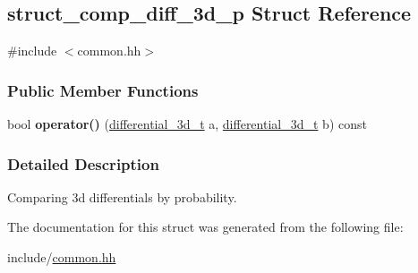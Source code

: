 \hypertarget{structstruct__comp__diff__3d__p}{\subsection{struct\-\_\-comp\-\_\-diff\-\_\-3d\-\_\-p \-Struct \-Reference}
\label{structstruct__comp__diff__3d__p}
}


{\ttfamily \#include $<$common.\-hh$>$}

\subsubsection*{\-Public \-Member \-Functions}
\begin{DoxyCompactItemize}
\item 
\hypertarget{structstruct__comp__diff__3d__p_a364005f05d94cd9f4477692cc3404bf1}{bool {\bfseries operator()} (\hyperlink{structdifferential__3d__t}{differential\-\_\-3d\-\_\-t} a, \hyperlink{structdifferential__3d__t}{differential\-\_\-3d\-\_\-t} b) const }\label{structstruct__comp__diff__3d__p_a364005f05d94cd9f4477692cc3404bf1}

\end{DoxyCompactItemize}


\subsubsection{\-Detailed \-Description}
\-Comparing 3d differentials by probability. 

\-The documentation for this struct was generated from the following file\-:\begin{DoxyCompactItemize}
\item 
include/\hyperlink{common_8hh}{common.\-hh}\end{DoxyCompactItemize}
